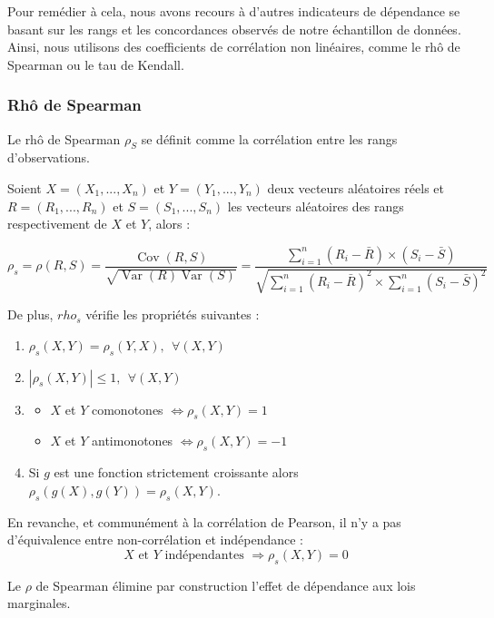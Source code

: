 Pour remédier à cela, nous avons recours à d’autres indicateurs de dépendance se basant sur les rangs et les concordances observés de notre échantillon de données. 
Ainsi, nous utilisons des coefficients de corrélation non linéaires, comme le rhô de Spearman ou le tau de Kendall.

\subsubsection{Rhô de Spearman}

Le rhô de Spearman $\rho_S$ se définit comme la corrélation entre les rangs d'observations.

Soient $X=(X_1,...,X_n)$ et $Y=(Y_1,...,Y_n)$ deux vecteurs aléatoires réels et $R = (R_1,...,R_n)$ et $S = (S_1,...,S_n)$ les vecteurs aléatoires des rangs respectivement
de $X$ et $Y$, alors :

$$
\rho_s = \rho(R,S) = \frac{\operatorname{Cov}(R,S)}{\sqrt{ \operatorname{Var}(R) \operatorname{Var}(S)}} = \frac{ \sum_{i=1}^n (R_i - \bar{R}) \times (S_i - \bar{S})  }{ \sqrt{   \sum_{i=1}^n (R_i - \bar{R})^2 \times  \sum_{i=1}^n (S_i - \bar{S})^2    }    }
$$

De plus, $rho_s$ vérifie les propriétés suivantes :

\begin{enumerate}

\item $\rho_s(X,Y) = \rho_s(Y,X), ~~\forall (X,Y)$
\item $|\rho_s(X,Y)| \leq 1, ~~\forall (X,Y)$
\item 
\begin{itemize}
\item $X$ et $Y$ comonotones $\Longleftrightarrow \rho_s(X,Y)=1$
\item $X$ et $Y$ antimonotones $\Longleftrightarrow \rho_s(X,Y)=-1$
\end{itemize}
\item Si $g$ est une fonction strictement croissante alors $\rho_s(g(X),g(Y))=\rho_s(X,Y)$.

\end{enumerate}

En revanche, et communément à la corrélation de Pearson, il n’y a pas d’équivalence entre non-corrélation et indépendance :
$$
X \text{~et~} Y \text{~indépendantes~} \Longrightarrow \rho_s(X,Y) = 0
$$
	
Le $\rho$ de Spearman élimine par construction l’effet de dépendance aux lois marginales.

